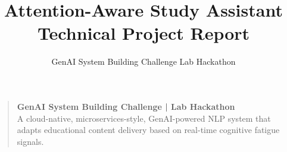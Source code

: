 \documentclass[11pt,a4paper]{article}
\title{Attention-Aware Study Assistant\\Technical Project Report}
\author{GenAI System Building Challenge \textbar{} Lab Hackathon}
\date{}
\begin{document}
\maketitle

\begin{quote}
\textbf{GenAI System Building Challenge | Lab Hackathon}\\
A cloud-native, microservices-style, GenAI-powered NLP system that adapts educational content delivery based on real-time cognitive fatigue signals.
\end{quote}

\tableofcontents
\newpage
















\end{document}
